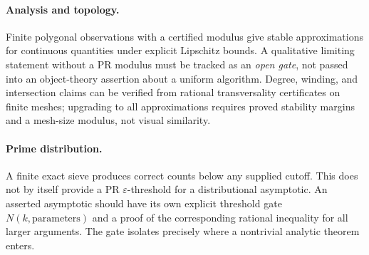 \documentclass[11pt]{article}
\begin{document}
\paragraph{Analysis and topology.} Finite polygonal observations with a certified modulus give stable approximations for continuous quantities under explicit Lipschitz bounds. A qualitative limiting statement without a PR modulus must be tracked as an \emph{open gate}, not passed into an object-theory assertion about a uniform algorithm. Degree, winding, and intersection claims can be verified from rational transversality certificates on finite meshes; upgrading to all approximations requires proved stability margins and a mesh-size modulus, not visual similarity.
\paragraph{Prime distribution.} A finite exact sieve produces correct counts below any supplied cutoff. This does not by itself provide a PR \(\varepsilon\)-threshold for a distributional asymptotic. An asserted asymptotic should have its own explicit threshold gate \(N(k,\text{parameters})\) and a proof of the corresponding rational inequality for all larger arguments. The gate isolates precisely where a nontrivial analytic theorem enters.
\end{document}
